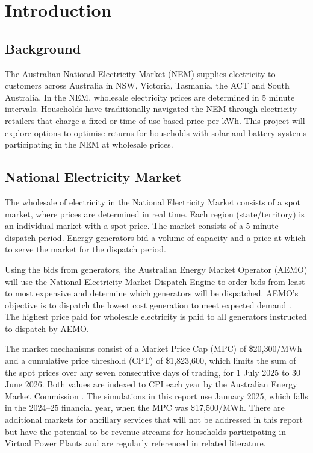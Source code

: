 \chapter{Introduction}
\label{ch:intro}

\section{Background}
\label{sec:background}
The Australian National Electricity Market (NEM) supplies electricity to customers across Australia in NSW, Victoria, Tasmania, the ACT and South Australia. In the NEM, wholesale electricity prices are determined in 5 minute intervals. Households have traditionally navigated the NEM through electricity retailers that charge a fixed or time of use based price per kWh. This project will explore options to optimise returns for households with solar and battery systems participating in the NEM at wholesale prices.

\section{National Electricity Market}
The wholesale of electricity in the National Electricity Market consists of a spot market, where prices are determined in real time. Each region (state/territory) is an individual market with a spot price. The market consists of a 5-minute dispatch period. Energy generators bid a volume of capacity and a price at which to serve the market for the dispatch period.

Using the bids from generators, the Australian Energy Market Operator (AEMO) will use the National Electricity Market Dispatch Engine to order bids from least to most expensive and determine which generators will be dispatched. AEMO's objective is to dispatch the lowest cost generation to meet expected demand \cite{aemc_dispatch}. The highest price paid for wholesale electricity is paid to all generators instructed to dispatch by AEMO. 

The market mechanisms consist of a Market Price Cap (MPC) of \$20,300/MWh and a cumulative price threshold (CPT) of \$1,823,600, which limits the sum of the spot prices over any seven consecutive days of trading, for 1 July 2025 to 30 June 2026. Both values are indexed to CPI each year by the Australian Energy Market Commission \cite{aemc_market_price_cap}. The simulations in this report use January 2025, which falls in the 2024--25 financial year, when the MPC was \$17,500/MWh. There are additional markets for ancillary services \cite{aemo_ancillary_services} that will not be addressed in this report but have the potential to be revenue streams for households participating in Virtual Power Plants and are regularly referenced in related literature.

